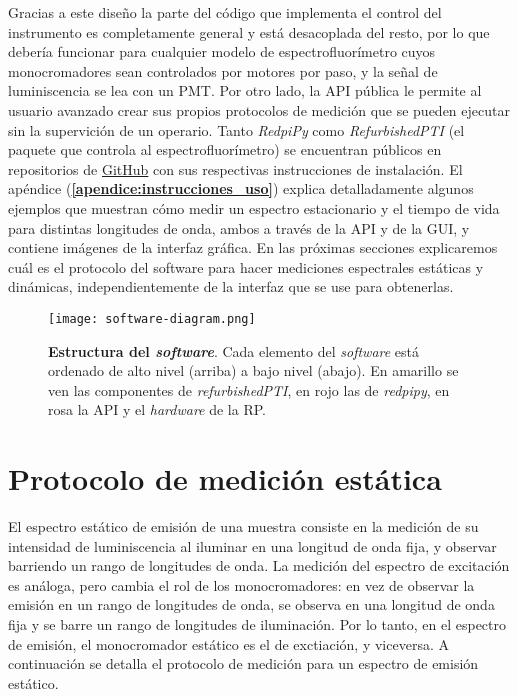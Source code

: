 Gracias a este diseño la parte del código que implementa el control del instrumento es completamente general y está desacoplada del resto, por lo que debería funcionar para cualquier modelo de espectrofluorímetro cuyos monocromadores sean controlados por motores por paso, y la señal de luminiscencia se lea con un PMT.
Por otro lado, la API pública le permite al usuario avanzado crear sus propios protocolos de medición que se pueden ejecutar sin la supervición de un operario.
Tanto \textit{RedpiPy} como \textit{RefurbishedPTI} (el paquete que controla al espectrofluorímetro) se encuentran públicos en repositorios de \href{https://github.com}{GitHub} con sus respectivas instrucciones de instalación. 
El apéndice (\textbf{\ref{apendice:instrucciones_uso}}) explica detalladamente algunos ejemplos que muestran cómo medir un espectro estacionario y el tiempo de vida para distintas longitudes de onda, ambos a través de la API y de la GUI, y contiene imágenes de la interfaz gráfica.
En las próximas secciones explicaremos cuál es el protocolo del software para hacer mediciones espectrales estáticas y dinámicas, independientemente de la interfaz que se use para obtenerlas.



\begin{figure}[t]
     \centering
     \texttt{[image: software-diagram.png]}
     \caption{\textbf{Estructura del \textit{software}}. Cada elemento del \textit{software} está ordenado de alto nivel (arriba) a bajo nivel (abajo). En amarillo se ven las componentes de \textit{refurbishedPTI}, en rojo las de \textit{redpipy}, en rosa la API y el \textit{hardware} de la RP.}
     \label{fig:code}
\end{figure}

\section{Protocolo de medición estática}

El espectro estático de emisión de una muestra consiste en la medición de su intensidad de luminiscencia al iluminar en una longitud de onda fija, y observar barriendo un rango de longitudes de onda.
La medición del espectro de excitación es análoga, pero cambia el rol de los monocromadores: en vez de observar la emisión en un rango de longitudes de onda, se observa en una longitud de onda fija y se barre un rango de longitudes de iluminación.
Por lo tanto, en el espectro de emisión, el monocromador estático es el de exctiación, y viceversa.
A continuación se detalla el protocolo de medición para un espectro de emisión estático.


